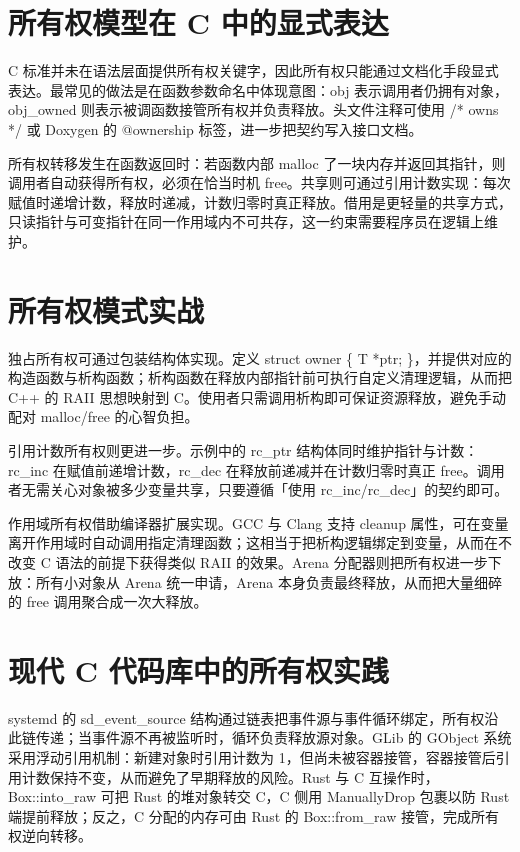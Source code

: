 \chapter{所有权模型在 C 中的显式表达}
C 标准并未在语法层面提供所有权关键字，因此所有权只能通过文档化手段显式表达。最常见的做法是在函数参数命名中体现意图：obj 表示调用者仍拥有对象，obj\_{}owned 则表示被调函数接管所有权并负责释放。头文件注释可使用 /* owns */ 或 Doxygen 的 @ownership 标签，进一步把契约写入接口文档。\par
所有权转移发生在函数返回时：若函数内部 malloc 了一块内存并返回其指针，则调用者自动获得所有权，必须在恰当时机 free。共享则可通过引用计数实现：每次赋值时递增计数，释放时递减，计数归零时真正释放。借用是更轻量的共享方式，只读指针与可变指针在同一作用域内不可共存，这一约束需要程序员在逻辑上维护。\par
\chapter{所有权模式实战}
独占所有权可通过包装结构体实现。定义 struct owner \{{} T *ptr; \}{}，并提供对应的构造函数与析构函数；析构函数在释放内部指针前可执行自定义清理逻辑，从而把 C++ 的 RAII 思想映射到 C。使用者只需调用析构即可保证资源释放，避免手动配对 malloc/free 的心智负担。\par
引用计数所有权则更进一步。示例中的 rc\_{}ptr 结构体同时维护指针与计数：rc\_{}inc 在赋值前递增计数，rc\_{}dec 在释放前递减并在计数归零时真正 free。调用者无需关心对象被多少变量共享，只要遵循「使用 rc\_{}inc/rc\_{}dec」的契约即可。\par
作用域所有权借助编译器扩展实现。GCC 与 Clang 支持 cleanup 属性，可在变量离开作用域时自动调用指定清理函数；这相当于把析构逻辑绑定到变量，从而在不改变 C 语法的前提下获得类似 RAII 的效果。Arena 分配器则把所有权进一步下放：所有小对象从 Arena 统一申请，Arena 本身负责最终释放，从而把大量细碎的 free 调用聚合成一次大释放。\par
\chapter{现代 C 代码库中的所有权实践}
systemd 的 sd\_{}event\_{}source 结构通过链表把事件源与事件循环绑定，所有权沿此链传递；当事件源不再被监听时，循环负责释放源对象。GLib 的 GObject 系统采用浮动引用机制：新建对象时引用计数为 1，但尚未被容器接管，容器接管后引用计数保持不变，从而避免了早期释放的风险。Rust 与 C 互操作时，Box::into\_{}raw 可把 Rust 的堆对象转交 C，C 侧用 ManuallyDrop 包裹以防 Rust 端提前释放；反之，C 分配的内存可由 Rust 的 Box::from\_{}raw 接管，完成所有权逆向转移。\par

